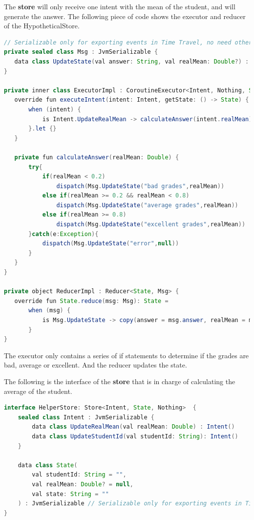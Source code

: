 The \textbf{store} will only receive one intent with the mean of the student, and will generate the answer. The following piece of code shows the executor and reducer of the HypotheticalStore.

\begin{lstlisting}[language=java]
// Serializable only for exporting events in Time Travel, no need otherwise.
private sealed class Msg : JvmSerializable {
   data class UpdateState(val answer: String, val realMean: Double?) : Msg()
}

private inner class ExecutorImpl : CoroutineExecutor<Intent, Nothing, State, Msg, Nothing>() {
   override fun executeIntent(intent: Intent, getState: () -> State) {
       when (intent) {
           is Intent.UpdateRealMean -> calculateAnswer(intent.realMean)
       }.let {}
   }

   private fun calculateAnswer(realMean: Double) {
       try{
           if(realMean < 0.2)
               dispatch(Msg.UpdateState("bad grades",realMean))
           else if(realMean >= 0.2 && realMean < 0.8)
               dispatch(Msg.UpdateState("average grades",realMean))
           else if(realMean >= 0.8)
               dispatch(Msg.UpdateState("excellent grades",realMean))
       }catch(e:Exception){
           dispatch(Msg.UpdateState("error",null))
       }
   }
}

private object ReducerImpl : Reducer<State, Msg> {
   override fun State.reduce(msg: Msg): State =
       when (msg) {
           is Msg.UpdateState -> copy(answer = msg.answer, realMean = msg.realMean)
       }
}

\end{lstlisting}

The executor only contains a series of if statements to determine if the grades are bad, average or excellent. And the reducer updates the state.

The following is the interface of the \textbf{store} that is in charge of calculating the average of the student.

\begin{lstlisting}[language=java]
interface HelperStore: Store<Intent, State, Nothing>  {
    sealed class Intent : JvmSerializable {
        data class UpdateRealMean(val realMean: Double) : Intent()
        data class UpdateStudentId(val studentId: String): Intent()
    }

    data class State(
        val studentId: String = "",
        val realMean: Double? = null,
        val state: String = ""
    ) : JvmSerializable // Serializable only for exporting events in Time Travel, no need otherwise.
}
\end{lstlisting}

